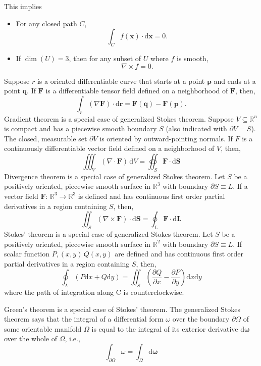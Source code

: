 \documentclass[a4paper,12pt]{report}
\begin{document}
{{{{{{{{{{{{This implies 
\begin{itemize}
\item For any closed path $C$, 
\[\int_Cf(\mathbf{x})\cdot\mathrm{d}\mathbf{x}=0.\]
\item If $\operatorname{dim}(U)=3$, then for any subset of $U$ where $f$ is smooth,
\[\nabla\times f=0.\]
\end{itemize}
Suppose $r$ is a oriented differentiable curve that starts at a point $\mathbf{p}$ and ends at a point $\mathbf{q}$. If $\mathbf{F}$ is a differentiable tensor field defined on a neighborhood of $\mathbf{F}$, then,
\[\int_r(\nabla\mathbf{F})\cdot\mathrm{d}\mathbf{r}=\mathbf{F}\left(\mathbf{q}\right)-\mathbf{F}\left(\mathbf{p}\right).\]
Gradient theorem is a special case of generalized Stokes theorem.
Suppose $V\subseteq\mathbb{R}^n$ is compact and has a piecewise smooth boundary $S$ (also indicated with $\partial V=S$). The closed, measurable set $\partial V$ is oriented by outward-pointing normals. If $F$ is a continuously differentiable vector field defined on a neighborhood of $V$, then,
\[\iiint_V\left(\nabla\cdot\mathbf {F}\right)\,\mathrm{d}V=\oiint_S\mathbf{F}\cdot\mathrm{d}\mathbf{S}\]
Divergence theorem is a special case of generalized Stokes theorem.
Let $S$ be a positively oriented, piecewise smooth surface in $\mathbb{R}^3$ with boundary $\partial S\equiv L$. If a vector field $\mathbf{F}:\,\mathbb{R}^3\rightarrow\mathbb{R}^3$ is defined and has continuous first order partial derivatives in a region containing $S$, then,
\[\iint_S(\nabla\times\mathbf{F})\cdot \mathrm{d}\mathbf{S}=\oint_{L}\mathbf{F}\cdot\mathrm{d}\mathbf{L}\]
Stokes' theorem is a special case of generalized Stokes theorem.
Let $S$ be a positively oriented, piecewise smooth surface in $\mathbb{R}^2$ with boundary $\partial S\equiv L$. If scalar function $P,(x,y)\,Q(x,y)$ are defined and has continuous first order partial derivatives in a region containing $S$, then,
\[\oint_L (P\mathrm{d}x+Q\mathrm{d}y)=\iint_S\left(\frac{\partial Q}{\partial x}-\frac{\partial P}{\partial y}\right)\mathrm{d}x\mathrm{d}y\]
where the path of integration along C is counterclockwise.

Green's theorem is a special case of Stokes' theorem.
The generalized Stokes theorem says that the integral of a differential form $\omega$ over the boundary $\partial\Omega$ of some orientable manifold $\Omega$ is equal to the integral of its exterior derivative $\mathrm{d}\boldsymbol{\omega}$ over the whole of $\Omega$, i.e.,
\[\int _{\partial\Omega}\omega=\int_{\Omega}\mathrm{d}\boldsymbol{\omega}\]



}}}}}}}}}}}}
\end{document}
